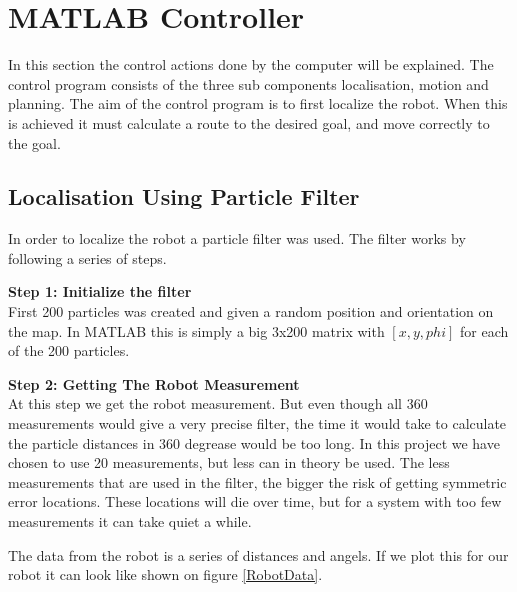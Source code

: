 \section{MATLAB Controller}
In this section the control actions done by the computer will be explained. The control program consists of the three sub components localisation, motion and planning. The aim of the control program is to first localize the robot. When this is achieved it must calculate a route to the desired goal, and move correctly to the goal. 



\subsection{Localisation Using Particle Filter}
In order to localize the robot a particle filter was used. The filter works by following a series of steps. 

\textbf{Step 1: Initialize the filter}\\
First 200 particles was created and given a random position and orientation on the map. In MATLAB this is simply a big 3x200 matrix with $[x, y, phi]$ for each of the 200 particles. 

\textbf{Step 2: Getting The Robot Measurement}\\
At this step we get the robot measurement. But even though all 360 measurements would give a very precise filter, the time it would take to calculate the particle distances in 360 degrease would be too long. In this project we have chosen to use 20 measurements, but less can in theory be used. The less measurements that are used in the filter, the bigger the risk of getting symmetric error locations. These locations will die over time, but for a system with too few measurements it can take quiet a while. 

The data from the robot is a series of distances and angels. If we plot this for our robot it can look like shown on figure \ref{RobotData}.

